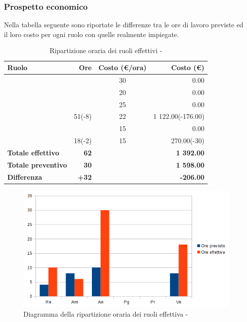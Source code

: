 \documentclass[12pt,a4paper]{article}
\begin{document}
\subsubsection{Prospetto economico}
Nella tabella seguente sono riportate le differenze tra le ore di lavoro previste ed il loro costo per ogni ruolo con quelle realmente impiegate.

\begin{table}[H]
	\begin{center}
		\begin{tabular}{l r c r}
			\toprule
			\textbf{Ruolo}	& \textbf{Ore} & \textbf{Costo (\euro/ora)}	& \textbf{Costo (\euro)} \\ \midrule
			\midrule
			\RE{} & & 30 & 0.00 \\ \midrule
			\AM{} & & 20 & 0.00 \\ \midrule
			\AN{} & & 25 & 0.00 \\ \midrule
            \PG{} & 51(-8) & 22 & 1 122.00(-176.00) \\ \midrule
			\PR{} & & 15 & 0.00 \\ \midrule
            \VR{} & 18(-2) & 15 & 270.00(-30) \\ \midrule
            \textbf{Totale effettivo} & \textbf{62} &  & \textbf{1 392.00} \\ \midrule
			\textbf{Totale preventivo} & \textbf{30} &  & \textbf{1 598.00} \\ \midrule
			\textbf{Differenza} & \textbf{+32} &  & \textbf{-206.00} \\ \midrule
			\bottomrule
		\end{tabular}
		\caption{Ripartizione oraria dei ruoli effettivi - \FPA{}}
	\end{center}
\end{table}

\begin{center}
	\begin{figure}[H]
		\centering
		\includegraphics[width=\textwidth]{../img/diagrammaBarreAnalisiDiDettaglioConsuntivo.png}
		\caption{Diagramma della ripartizione oraria dei ruoli effettiva - \FA{}}
	\end{figure}
\end{center}
\end{document}
